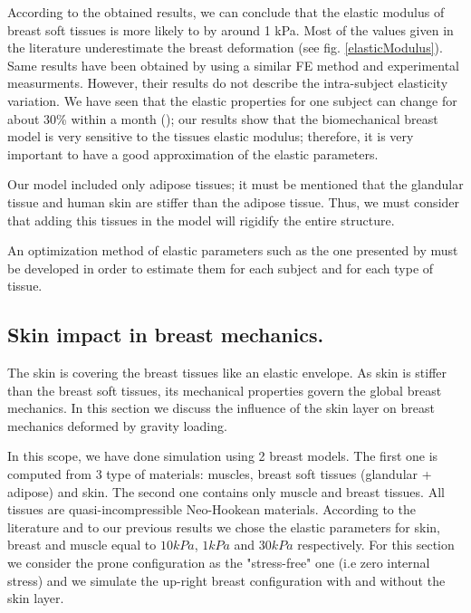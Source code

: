According to the obtained results, we can conclude that the elastic modulus of breast soft tissues is more likely to by around 1 kPa. Most of the values given in the literature underestimate the breast deformation (see fig. \ref{elasticModulus}). Same results have been obtained by \cite{carter_determining_2009, han_development_2012, Rajagopal_creating_2008} using a similar FE method and experimental measurments. However, their results do not describe the intra-subject elasticity variation. We have seen that the elastic properties for one subject can change for about 30\% within a month (\cite{lorenzen_menstrual-cycle_2003}); our results show that the biomechanical breast model is very sensitive to the tissues elastic modulus; therefore, it is very important to have a good approximation of the elastic parameters. 

Our model included only adipose tissues; it must be mentioned that the glandular tissue and human skin are stiffer than the adipose tissue. Thus, we must consider that adding this tissues in the model will rigidify the entire structure.

An optimization method of elastic parameters such as the one presented by \cite{carter_determining_2009} must be developed in order to estimate them for each subject and for each type of tissue.

\subsection{Skin impact in breast mechanics.}

The skin is covering the breast tissues like an elastic envelope. As skin is stiffer than the breast soft tissues, its mechanical properties govern the global breast mechanics. In this section we discuss the influence of the skin layer on breast mechanics deformed by gravity loading. 

In this scope, we have done simulation using 2 breast models. The first one is computed from 3 type of materials: muscles, breast soft tissues (glandular + adipose) and skin. The second one contains only muscle and breast tissues. All tissues are quasi-incompressible Neo-Hookean materials. According to the literature and to our previous results we chose the elastic parameters for skin, breast and muscle equal to $10 kPa$, $1 kPa$ and $30kPa$ respectively. For this section we consider the prone configuration as the "stress-free" one (i.e zero internal stress) and we simulate the up-right breast configuration with and without the skin layer. 

